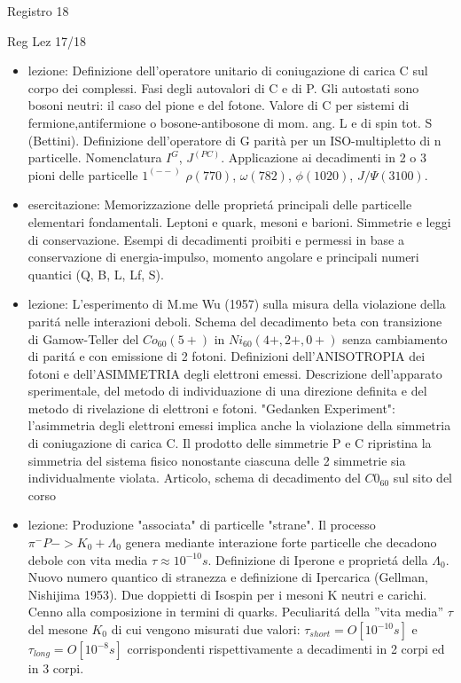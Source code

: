 \begin{frame}{Registro 18}
\begin{frame}[allowframebreaks]{Reg Lez 17/18}
\begin{itemize}
\item lezione: Definizione dell'operatore unitario di coniugazione di carica C sul corpo dei complessi. Fasi degli autovalori di C e di P. Gli autostati sono bosoni neutri: il caso del pione e del fotone. Valore di C per sistemi di fermione,antifermione o bosone-antibosone di mom. ang. L e di spin tot. S (Bettini). Definizione dell'operatore di G parità per un ISO-multipletto di n particelle. Nomenclatura $I^G$, $J^{(PC)}$. Applicazione ai decadimenti in 2 o 3 pioni delle particelle $1^{(--)}$ $\rho(770)$, $\omega(782)$, $\phi(1020)$, $J/\Psi(3100)$.

\item esercitazione: Memorizzazione delle propriet\'a principali delle particelle elementari fondamentali. Leptoni e quark, mesoni e barioni. Simmetrie e leggi di conservazione. Esempi di decadimenti proibiti e permessi in base a conservazione di energia-impulso, momento angolare e principali numeri quantici (Q, B, L, Lf, S).

\item lezione: L'esperimento di M.me Wu (1957) sulla misura della violazione della parit\'a nelle interazioni deboli. Schema del decadimento beta con transizione di Gamow-Teller del $Co_{60}(5+)$ in $Ni_{60}(4+,2+,0+)$ senza cambiamento di parit\'a e con emissione di 2 fotoni. Definizioni dell'ANISOTROPIA dei fotoni e dell'ASIMMETRIA degli elettroni emessi. Descrizione dell'apparato sperimentale, del metodo di individuazione di una direzione definita e del metodo di rivelazione di elettroni e fotoni. "Gedanken Experiment": l'asimmetria degli elettroni emessi implica anche la violazione della simmetria di coniugazione di carica C. Il prodotto delle simmetrie P e C ripristina la simmetria del sistema fisico nonostante ciascuna delle 2 simmetrie sia individualmente violata. Articolo, schema di decadimento del $C0_{60}$ sul sito del corso

\item lezione: Produzione "associata" di particelle "strane". Il processo $\pi^- P ->K_0 + \Lambda_0$ genera mediante interazione forte particelle che decadono debole con vita media $\tau\approx 10^{-10} s$. Definizione di Iperone e propriet\'a della $\Lambda_0$. Nuovo numero quantico di stranezza e definizione di Ipercarica (Gellman, Nishijima 1953). Due doppietti di Isospin per i mesoni K neutri e carichi. Cenno alla composizione in termini di quarks. Peculiarit\'a della ''vita media'' $\tau$ del mesone $K_0$ di cui vengono misurati due valori: $\tau_{short}=O[10^{-10}s]$ e $\tau_{long}=O[10^{-8}s]$ corrispondenti rispettivamente a decadimenti in 2 corpi ed in 3 corpi. 


\end{itemize}
\end{frame}
\end{frame}
